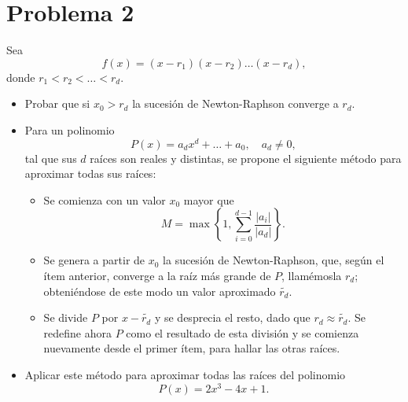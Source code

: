 
\section{Problema 2}
Sea
\[
f(x) = (x - r_1)(x - r_2) \dots (x - r_d),
\]
donde $r_1 < r_2 < \dots < r_d$.

\begin{itemize}
    \item Probar que si $x_0 > r_d$ la sucesión de Newton-Raphson converge a $r_d$.
    \item Para un polinomio
    \[
    P(x) = a_d x^d + \dots + a_0, \quad a_d \neq 0,
    \]
    tal que sus $d$ raíces son reales y distintas, se propone el siguiente método para aproximar todas sus raíces:
    \begin{itemize}
        \item Se comienza con un valor $x_0$ mayor que
        \[
        M = \max \left\{ 1, \sum_{i=0}^{d-1} \frac{|a_i|}{|a_d|} \right\}.
        \]
        \item Se genera a partir de $x_0$ la sucesión de Newton-Raphson, que, según el ítem anterior, converge a la raíz más grande de $P$, llamémosla $r_d$; obteniéndose de este modo un valor aproximado $\tilde{r_d}$.
        \item Se divide $P$ por $x - \tilde{r_d}$ y se desprecia el resto, dado que $r_d \approx \tilde{r_d}$. Se redefine ahora $P$ como el resultado de esta división y se comienza nuevamente desde el primer ítem, para hallar las otras raíces.
    \end{itemize}
    \item Aplicar este método para aproximar todas las raíces del polinomio
    \[
    P(x) = 2x^3 - 4x + 1.
    \]
\end{itemize}
